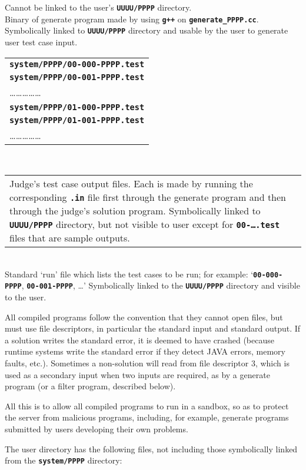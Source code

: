 \documentclass[12pt]{article}
\newcommand{\TT}[1]{{\tt \bfseries #1}}
\newcommand{\EOL}{\penalty \exhyphenpenalty}
\newenvironment{indpar}[1][0.4in]%
	{\begin{list}{}%
		     {\setlength{\itemsep}{0in}%
		      \setlength{\topsep}{0in}%
		      \setlength{\parsep}{1ex}%
		      \setlength{\labelwidth}{#1}%
		      \setlength{\leftmargin}{#1}%
		      \addtolength{\leftmargin}{\labelsep}}%
	 \item}%
	{\end{list}}
\newcommand{\ITEM}{\hspace*{-0.2in}}
\begin{document}
\begin{indpar}
    Cannot be linked to the user's \TT{UUUU/PPPP} directory.
\\
\ITEM\TT{system/PPPP/generate\_PPPP}  Binary of generate
    program made by using \TT{g++} on \TT{gen\-erate\_\EOL PPPP.cc}.
    Symbolically linked to \TT{UUUU/PPPP} directory and usable
    by the user to generate user test case input.
\\[1ex]
\ITEM\begin{tabular}[t]{@{}l}
     \TT{system/PPPP/00-000-PPPP.test} \\
     \TT{system/PPPP/00-001-PPPP.test} \\
     \ldots\ldots\ldots\ldots\ldots \\
     \TT{system/PPPP/01-000-PPPP.test} \\
     \TT{system/PPPP/01-001-PPPP.test} \\
     \ldots\ldots\ldots\ldots\ldots \\
     \end{tabular}
     ~~~~
     \begin{tabular}[t]{p{3in}}
     Judge's test case output files.  Each is made by running
     the corresponding \TT{.in} file first through the generate
     program and then through the judge's solution program.
     Symbolically linked to \TT{UUUU/PPPP}
     directory, but not visible to user except for \TT{00-\ldots.test}
     files that are sample outputs.
     \end{tabular}
\\
\ITEM\TT{system/PPPP/PPPP.run}  Standard `run' file which lists
    the test cases to be run; for example:
   `{\TT{00-000-PPPP}, \TT{00-001-PPPP}, \ldots}'
    Symbolically linked to
    the \TT{UUUU/PPPP} directory and visible to the user.
\end{indpar}

All compiled programs follow the convention that they cannot
open files, but must use file descriptors, in particular
the standard input and standard output.  If a solution writes
the standard error, it is deemed to have crashed (because
runtime systems write the standard error if they detect
JAVA errors, memory faults, etc.).  Sometimes a non-solution
will read from file descriptor 3, which is used as a secondary
input when two inputs are required, as by a generate program
(or a filter program, described below).

All this is to allow all compiled programs to run in a sandbox,
so as to protect the server from malicious programs, including,
for example, generate programs submitted by users developing
their own problems.

The user directory has the following files, not including
those symbolically linked from the \TT{system/PPPP} directory:
\end{document}
